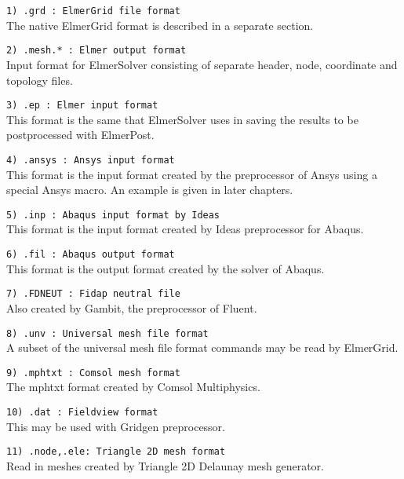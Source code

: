 \begin{description}
\item \texttt{1)  .grd      : ElmerGrid file format} \\
The native ElmerGrid format is  described in a separate section.

\item \texttt{2)  .mesh.*  : Elmer output format} \\
Input format for ElmerSolver consisting of separate header,
node, coordinate and topology files.

\item \texttt{3)  .ep      : Elmer input format} \\
This format is the same that
ElmerSolver uses in saving the results to be 
postprocessed with ElmerPost. 

\item \texttt{4)  .ansys    : Ansys input format} \\
This format is the input format 
created by the preprocessor of Ansys using a special
Ansys macro.
An example is given in later chapters.

\item \texttt{5)  .inp    : Abaqus input format by Ideas} \\
This format is the input format 
created by Ideas preprocessor for Abaqus.

\item \texttt{6)  .fil    : Abaqus output format} \\
This format is the output format 
created by the solver of Abaqus.

\item \texttt{7)  .FDNEUT  : Fidap neutral file} \\
Also created by Gambit, the preprocessor of Fluent.

\item \texttt{8) .unv : Universal mesh file format} \\
A subset of the universal mesh file format commands may be read by ElmerGrid.

\item \texttt{9)  .mphtxt   : Comsol mesh format} \\
The mphtxt format created by Comsol Multiphysics. 

\item \texttt{10)  .dat      : Fieldview format} \\
This may be used with Gridgen preprocessor.

\item \texttt{11) .node,.ele: Triangle 2D mesh format} \\
Read in meshes created by Triangle 2D Delaunay mesh generator.


\end{description}
